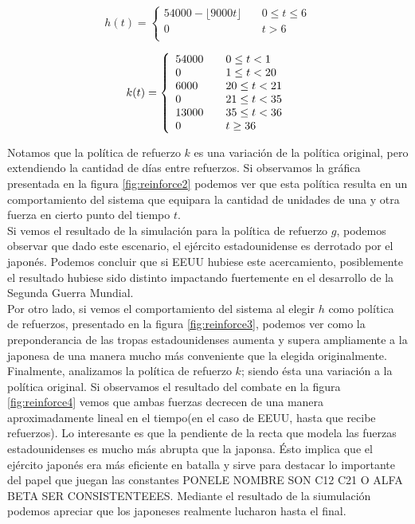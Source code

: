 \documentclass{sig-alternate}
\begin{document}
\begin{equation}
h(t) = \left\{ 
    \begin{array}{ll}
    54000 - \lfloor 9000t \rfloor & \quad 0 \leq t \leq 6 \\
    0 & \quad t > 6\\
    \end{array} \right.
\label{eq:refuerzo_h}
\end{equation}

\begin{equation}
k(t) = \left\{ 
    \begin{array}{l l}
    54000 & \quad 0 \leq t < 1 \\
    0 & \quad 1 \leq t < 20\\
    6000 & \quad 20 \leq t < 21\\
    0 & \quad 21 \leq t < 35\\
    13000 & \quad 35 \leq t < 36\\
    0 & \quad t \geq 36\\
    \end{array} \right.
\label{eq:refuerzo_k}
\end{equation}


Notamos que la política de refuerzo $k$ es una variación de la política original, pero extendiendo la cantidad de días entre refuerzos.
Si observamos la gráfica presentada en la figura \ref{fig:reinforce2} podemos ver que esta política resulta en un comportamiento del sistema
que equipara la cantidad de unidades de una y otra fuerza en cierto punto del tiempo $t$.\\
Si vemos el resultado de la simulación para la política de refuerzo $g$, podemos observar que dado este escenario, el ejército estadounidense es derrotado por el japonés. Podemos 
concluir que si EEUU hubiese este acercamiento, posiblemente el resultado hubiese sido distinto impactando fuertemente en el desarrollo de la Segunda Guerra Mundial.\\
Por otro lado, si vemos el comportamiento del sistema al elegir $h$ como política de refuerzos, presentado en la figura \ref{fig:reinforce3}, 
podemos ver como la preponderancia de las tropas estadounidenses aumenta y supera ampliamente a la japonesa de una manera mucho más conveniente que la elegida originalmente.\\
Finalmente, analizamos la política de refuerzo $k$; siendo ésta una variación a la política original. Si observamos el resultado del combate en la figura \ref{fig:reinforce4}
vemos que ambas fuerzas decrecen de una manera aproximadamente lineal en el tiempo(en el caso de EEUU, hasta que recibe refuerzos). Lo interesante es que la pendiente de la recta
que modela las fuerzas estadounidenses es mucho más abrupta que la japonsa. Ésto implica que el ejército japonés era más eficiente en batalla y sirve para destacar lo
importante del papel que juegan las constantes PONELE NOMBRE SON C12 C21 O ALFA BETA SER CONSISTENTEEES. Mediante el resultado de la siumulación podemos apreciar
que los japoneses realmente lucharon hasta el final.
\end{document}
